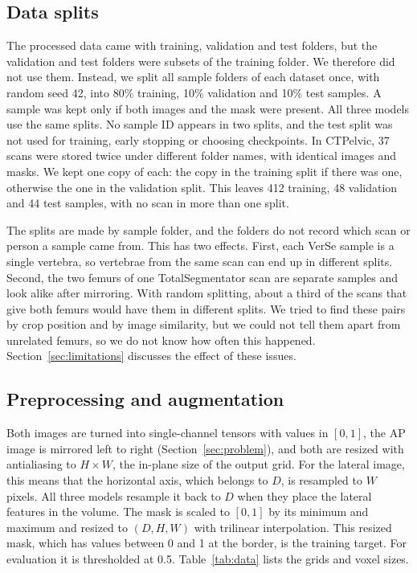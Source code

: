\documentclass[11pt]{article}
\begin{document}
\subsection{Data splits}\label{sec:splits}
The processed data came with training, validation and test folders, but the validation and test folders were subsets of the training folder. We therefore did not use them. Instead, we split all sample folders of each dataset once, with random seed 42, into 80\% training, 10\% validation and 10\% test samples. A sample was kept only if both images and the mask were present. All three models use the same splits. No sample ID appears in two splits, and the test split was not used for training, early stopping or choosing checkpoints. In CTPelvic, 37 scans were stored twice under different folder names, with identical images and masks. We kept one copy of each: the copy in the training split if there was one, otherwise the one in the validation split. This leaves 412 training, 48 validation and 44 test samples, with no scan in more than one split.

The splits are made by sample folder, and the folders do not record which scan or person a sample came from. This has two effects. First, each VerSe sample is a single vertebra, so vertebrae from the same scan can end up in different splits. Second, the two femurs of one TotalSegmentator scan are separate samples and look alike after mirroring. With random splitting, about a third of the scans that give both femurs would have them in different splits. We tried to find these pairs by crop position and by image similarity, but we could not tell them apart from unrelated femurs, so we do not know how often this happened. Section~\ref{sec:limitations} discusses the effect of these issues.

\subsection{Preprocessing and augmentation}\label{sec:preproc}
Both images are turned into single-channel tensors with values in $[0,1]$, the AP image is mirrored left to right (Section~\ref{sec:problem}), and both are resized with antialiasing to $H\times W$, the in-plane size of the output grid. For the lateral image, this means that the horizontal axis, which belongs to $D$, is resampled to $W$ pixels. All three models resample it back to $D$ when they place the lateral features in the volume. The mask is scaled to $[0,1]$ by its minimum and maximum and resized to $(D,H,W)$ with trilinear interpolation. This resized mask, which has values between 0 and 1 at the border, is the training target. For evaluation it is thresholded at 0.5. Table~\ref{tab:data} lists the grids and voxel sizes.
\end{document}
